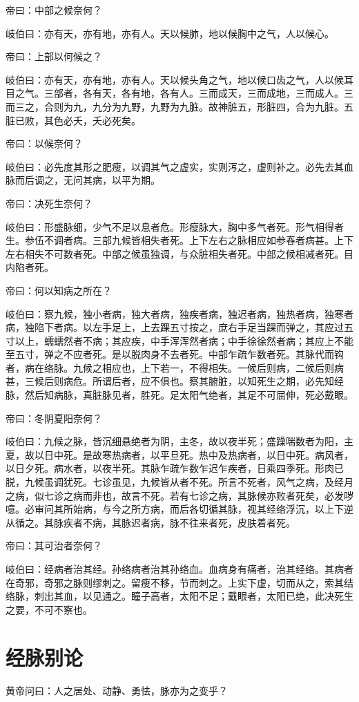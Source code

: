 \documentclass{article}%
\begin{document}
帝曰：中部之候奈何？

岐伯曰：亦有天，亦有地，亦有人。天以候肺，地以候胸中之气，人以候心。

帝曰：上部以何候之？

岐伯曰：亦有天，亦有地，亦有人。天以候头角之气，地以候口齿之气，人以候耳目之气。三部者，各有天，各有地，各有人。三而成天，三而成地，三而成人。三而三之，合则为九，九分为九野，九野为九脏。故神脏五，形脏四，合为九脏。五脏已败，其色必夭，夭必死矣。

帝曰：以候奈何？

岐伯曰：必先度其形之肥瘦，以调其气之虚实，实则泻之，虚则补之。必先去其血脉而后调之，无问其病，以平为期。

帝曰：决死生奈何？

岐伯曰：形盛脉细，少气不足以息者危。形瘦脉大，胸中多气者死。形气相得者生。参伍不调者病。三部九候皆相失者死。上下左右之脉相应如参舂者病甚。上下左右相失不可数者死。中部之候虽独调，与众脏相失者死。中部之候相减者死。目内陷者死。

帝曰：何以知病之所在？

岐伯曰：察九候，独小者病，独大者病，独疾者病，独迟者病，独热者病，独寒者病，独陷下者病。以左手足上，上去踝五寸按之，庶右手足当踝而弹之，其应过五寸以上，蠕蠕然者不病；其应疾，中手浑浑然者病；中手徐徐然者病；其应上不能至五寸，弹之不应者死。是以脱肉身不去者死。中部乍疏乍数者死。其脉代而钩者，病在络脉。九候之相应也，上下若一，不得相失。一候后则病，二候后则病甚，三候后则病危。所谓后者，应不俱也。察其腑脏，以知死生之期，必先知经脉，然后知病脉，真脏脉见者，胜死。足太阳气绝者，其足不可屈伸，死必戴眼。

帝曰：冬阴夏阳奈何？

岐伯曰：九候之脉，皆沉细悬绝者为阴，主冬，故以夜半死；盛躁喘数者为阳，主夏，故以日中死。是故寒热病者，以平旦死。热中及热病者，以日中死。病风者，以日夕死。病水者，以夜半死。其脉乍疏乍数乍迟乍疾者，日乘四季死。形肉已脱，九候虽调犹死。七诊虽见，九候皆从者不死。所言不死者，风气之病，及经月之病，似七诊之病而非也，故言不死。若有七诊之病，其脉候亦败者死矣，必发哕噫。必审问其所始病，与今之所方病，而后各切循其脉，视其经络浮沉，以上下逆从循之。其脉疾者不病，其脉迟者病，脉不往来者死，皮肤着者死。

帝曰：其可治者奈何？

岐伯曰：经病者治其经。孙络病者治其孙络血。血病身有痛者，治其经络。其病者在奇邪，奇邪之脉则缪刺之。留瘦不移，节而刺之。上实下虚，切而从之，索其结络脉，刺出其血，以见通之。瞳子高者，太阳不足；戴眼者，太阳已绝，此决死生之要，不可不察也。
\section{经脉别论}
黄帝问曰：人之居处、动静、勇怯，脉亦为之变乎？
\end{document}
